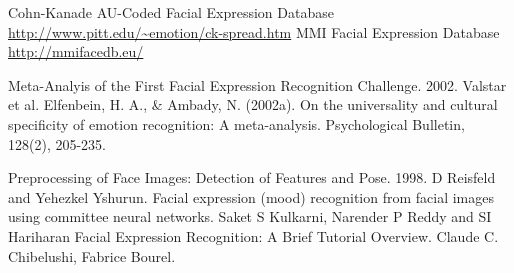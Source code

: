 \documentclass[10pt,twocolumn,letterpaper]{article}
\begin{document}
\begin{thebibliography}{1}
 Cohn-Kanade AU-Coded Facial Expression Database \url{http://www.pitt.edu/~emotion/ck-spread.htm}
 MMI Facial Expression Database \url{http://mmifacedb.eu/}

 Meta-Analyis of the First Facial Expression Recognition Challenge. 2002. Valstar et al.
 Elfenbein, H. A., & Ambady, N. (2002a). On the universality and cultural specificity of emotion recognition: A meta-analysis. Psychological Bulletin, 128(2), 205-235. 

 Preprocessing of Face Images: Detection of Features and Pose. 1998. D Reisfeld and Yehezkel Yshurun.
 Facial expression (mood) recognition from facial images using committee neural networks. Saket S Kulkarni, Narender P Reddy and SI Hariharan
 Facial Expression Recognition: A Brief Tutorial Overview. Claude C. Chibelushi, Fabrice Bourel.
\end{thebibliography}
\end{document}
